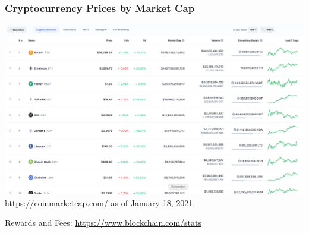 \documentclass{beamer}
\begin{document}
\begin{frame}
  \frametitle{Cryptocurrency Prices by Market Cap}
	\includegraphics[scale=0.2]{market}
	{\tiny{\url{https://coinmarketcap.com/} as of January 18, 2021.}}
	
	Rewards and Fees: \url{https://www.blockchain.com/stats}
\end{frame}
\end{document}
